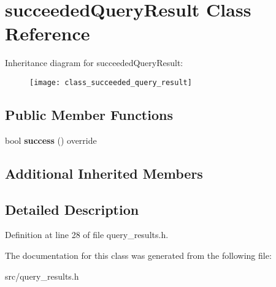 \hypertarget{class_succeeded_query_result}{}\section{succeeded\+Query\+Result Class Reference}
\label{class_succeeded_query_result}
Inheritance diagram for succeeded\+Query\+Result\+:\begin{figure}[H]
\begin{center}
\leavevmode
\texttt{[image: class\_succeeded\_query\_result]}
\end{center}
\end{figure}
\subsection*{Public Member Functions}
\begin{DoxyCompactItemize}
\item 
\mbox{\label{class_succeeded_query_result_a9080ba9ec97b32638efab6fa9472de94}} 
bool {\bfseries success} () override
\end{DoxyCompactItemize}
\subsection*{Additional Inherited Members}


\subsection{Detailed Description}


Definition at line 28 of file query\+\_\+results.\+h.



The documentation for this class was generated from the following file\+:\begin{DoxyCompactItemize}
\item 
src/query\+\_\+results.\+h\end{DoxyCompactItemize}
